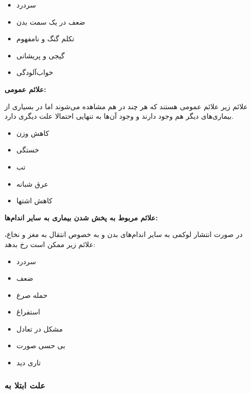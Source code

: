 \documentclass[12pt]{article}
\begin{document}
\begin{itemize}
	\item سردرد
	
	\item ضعف در یک سمت بدن
	
	\item تکلم گنگ و نامفهوم
	
	\item گیجی و پریشانی
	
	\item خواب‌آلودگی
\end{itemize}



\textbf{علائم عمومی:}

علائم زیر علائم عمومی هستند که هر چند در  هم مشاهده می‌شوند اما در بسیاری از بیماری‌های دیگر هم وجود دارند و وجود آن‌ها به تنهایی احتمالا علت دیگری دارد.

\begin{itemize}
	\item کاهش وزن
	
	\item خستگی
	
	\item تب
	
	\item عرق شبانه
	
	\item کاهش اشتها
\end{itemize}

\textbf{علائم مربوط به پخش شدن بیماری به سایر اندام‌ها:}

در صورت انتشار لوکمی به سایر اندام‌های بدن و به خصوص انتقال به مغز و نخاع، علائم زیر ممکن است رخ بدهد:

\begin{itemize}
	\item سردرد
	
	\item ضعف
	
	\item حمله صرع
	
	\item استفراغ
	
	\item مشکل در تعادل
	
	\item بی حسی صورت
	
	\item تاری دید
	
\end{itemize}
\subsubsection{علت ابتلا به }
\end{document}
